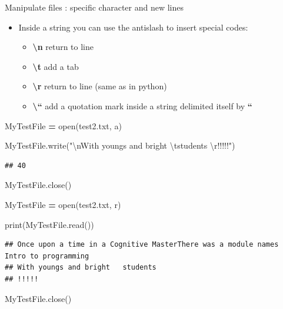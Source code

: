 \documentclass[
  8pt,
  ignorenonframetext,
]{beamer}
\newenvironment{Shaded}{\begin{snugshade}}{\end{snugshade}}
\newcommand{\BuiltInTok}[1]{#1}
\newcommand{\CharTok}[1]{\textcolor[rgb]{0.31,0.60,0.02}{#1}}
\newcommand{\NormalTok}[1]{#1}
\newcommand{\OperatorTok}[1]{\textcolor[rgb]{0.81,0.36,0.00}{\textbf{#1}}}
\newcommand{\StringTok}[1]{\textcolor[rgb]{0.31,0.60,0.02}{#1}}
\providecommand{\tightlist}{%
  \setlength{\itemsep}{0pt}\setlength{\parskip}{0pt}}
\begin{document}
\begin{frame}[fragile]{Manipulate files : specific character and new
lines}
\protect\hypertarget{manipulate-files-specific-character-and-new-lines}{}
\begin{itemize}
\tightlist
\item
  Inside a string you can use the antislash to insert special codes:

  \begin{itemize}
  \tightlist
  \item
    \textbf{\textbackslash n} return to line
  \item
    \textbf{\textbackslash t} add a tab
  \item
    \textbf{\textbackslash r} return to line (same as \n in python)
  \item
    \textbf{\textbackslash``} add a quotation mark inside a string
    delimited itself by \textbf{``}
  \end{itemize}
\end{itemize}

\begin{Shaded}
\begin{Highlighting}[]
\NormalTok{MyTestFile }\OperatorTok{=} \BuiltInTok{open}\NormalTok{(}\StringTok{\textquotesingle{}test2.txt\textquotesingle{}}\NormalTok{, }\StringTok{\textquotesingle{}a\textquotesingle{}}\NormalTok{)}

\NormalTok{MyTestFile.write(}\StringTok{"}\CharTok{\textbackslash{}n}\StringTok{With youngs and bright }\CharTok{\textbackslash{}t}\StringTok{students }\CharTok{\textbackslash{}r}\StringTok{!!!!!"}\NormalTok{)}
\end{Highlighting}
\end{Shaded}

\begin{verbatim}
## 40
\end{verbatim}

\begin{Shaded}
\begin{Highlighting}[]
\NormalTok{MyTestFile.close()}

\NormalTok{MyTestFile }\OperatorTok{=} \BuiltInTok{open}\NormalTok{(}\StringTok{\textquotesingle{}test2.txt\textquotesingle{}}\NormalTok{, }\StringTok{\textquotesingle{}r\textquotesingle{}}\NormalTok{)}

\BuiltInTok{print}\NormalTok{(MyTestFile.read())}
\end{Highlighting}
\end{Shaded}

\begin{verbatim}
## Once upon a time in a Cognitive MasterThere was a module names Intro to programming
## With youngs and bright   students 
## !!!!!
\end{verbatim}

\begin{Shaded}
\begin{Highlighting}[]
\NormalTok{MyTestFile.close()}
\end{Highlighting}
\end{Shaded}
\end{frame}
\end{document}
